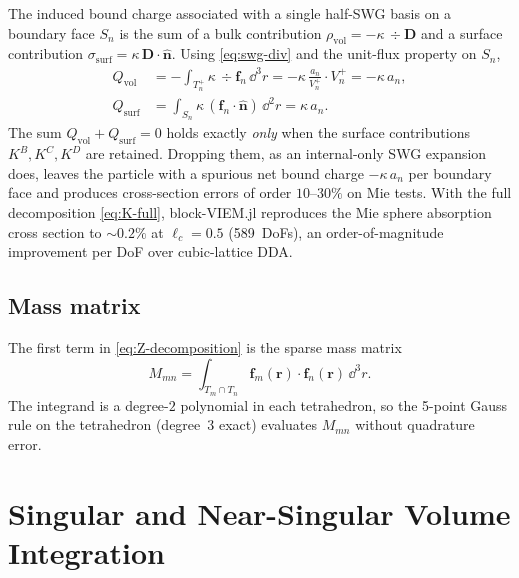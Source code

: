 \documentclass[11pt,a4paper]{article}
\begin{document}
The induced bound charge associated with a single half-SWG basis on a
boundary face $S_n$ is the sum of a bulk contribution
$\rho_{\text{vol}} = -\kappa\,\div\bm{D}$ and a surface contribution
$\sigma_{\text{surf}} = \kappa\,\bm{D}\!\cdot\!\hat{\bm{n}}$. Using
\eqref{eq:swg-div} and the unit-flux property on $S_n$,
\begin{align}
  Q_{\text{vol}}
    &= -\int_{T_n^{+}} \kappa\,\div\bm{f}_n\,\dd^{3}r
     = -\kappa\,\frac{a_n}{V_n^{+}}\cdot V_n^{+}
     = -\kappa\,a_n,
  \label{eq:Q-vol} \\
  Q_{\text{surf}}
    &= \int_{S_n} \kappa\,(\bm{f}_n\!\cdot\!\hat{\bm{n}})\,\dd^{2}r
     = \kappa\,a_n.
  \label{eq:Q-surf}
\end{align}
The sum $Q_{\text{vol}} + Q_{\text{surf}} = 0$ holds exactly
\emph{only} when the surface contributions
$K^{B}, K^{C}, K^{D}$ are retained. Dropping them, as an
internal-only SWG expansion does, leaves the particle with a spurious
net bound charge $-\kappa\,a_n$ per boundary face and produces
cross-section errors of order $10$--$30\%$ on Mie tests. With the full
decomposition \eqref{eq:K-full}, block-VIEM.jl reproduces the Mie sphere
absorption cross section to $\sim 0.2\%$ at $\ell_c = 0.5$ (589~DoFs),
an order-of-magnitude improvement per DoF over cubic-lattice DDA.

\subsection{Mass matrix}
\label{sec:mass}

The first term in \eqref{eq:Z-decomposition} is the sparse mass matrix
\begin{equation}
  M_{mn}
    = \int_{T_m\cap T_n} \bm{f}_m(\bm{r})\cdot\bm{f}_n(\bm{r})\,\dd^{3}r.
  \label{eq:mass}
\end{equation}
The integrand is a degree-$2$ polynomial in each tetrahedron, so the
5-point Gauss rule on the tetrahedron (degree~3 exact) evaluates
$M_{mn}$ without quadrature error.

\section{Singular and Near-Singular Volume Integration}
\label{sec:duffy}
\end{document}
